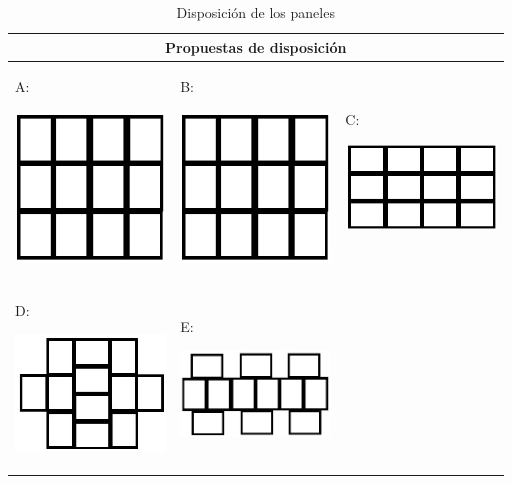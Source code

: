 \begin{table}[H]
	\centering
	\caption{Disposición de los paneles}
	\begin{tabular}{@{}|p{4cm}|p{4cm}|p{4cm}|}
		\hline
		\multicolumn{3}{|c|}{\textbf{Propuestas de disposición}} \\
		\hline \hline
		A:
		\begin{center}
			\includegraphics[width=4cm]{imagenes/panelA}
		\end{center} & 
		B:
		\begin{center}
			\includegraphics[width=4cm]{imagenes/panelB}
		\end{center} &
		C:
		\begin{center}
			\includegraphics[width=4cm]{imagenes/panelC}
		\end{center} 
		\\ \hline
		D:
		\begin{center}
			\includegraphics[width=4cm]{imagenes/panelD}
		\end{center} & 
		E:
		\begin{center}
			\includegraphics[width=4cm]{imagenes/panelE}

\end{center}
\end{tabular}
\end{table}
